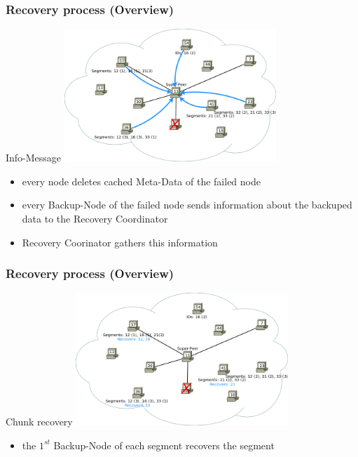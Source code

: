 \documentclass{beamer}
\begin{document}
	\begin{frame}
		\frametitle{Recovery process (Overview)}

		\begin{block}{Info-Message}
			\center\includegraphics[width=8cm]{./img/Recovery_Overview_03}

			\begin{itemize}
				\item every node deletes cached Meta-Data of the failed node
				\item every Backup-Node of the failed node sends information about the backuped data to the Recovery Coordinator
				\item Recovery Coorinator gathers this information
			\end{itemize}
		\end{block}
	\end{frame}

	\begin{frame}
		\frametitle{Recovery process (Overview)}

		\begin{block}{Chunk recovery}
			\center\includegraphics[width=8cm]{./img/Recovery_Overview_04}

			\begin{itemize}
				\item the $1^{st}$ Backup-Node of each segment recovers the segment
			\end{itemize}
		\end{block}
	\end{frame}
\end{document}
